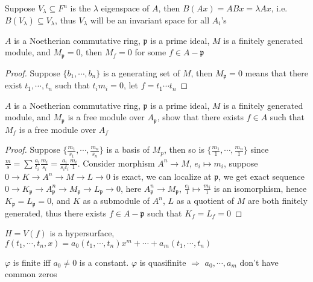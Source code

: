 \documentclass[main]{subfiles}
\begin{document}
\begin{solution}
Suppose $V_\lambda\subseteq F^n$ is the $\lambda$ eigenspace of $A$, then $B(Ax)=ABx=\lambda Ax$, i.e. $B(V_\lambda)\subseteq V_\lambda$, thus $V_\lambda$ will be an invariant space for all $A_i$'s
\end{solution}

\begin{exercise}\label{02/24/2020-16:00}
$A$ is a Noetherian commutative ring, $\mathfrak p$ is a prime ideal, $M$ is a finitely generated module, and $M_{\mathfrak p}=0$, then $M_f=0$ for some $f\in A-\mathfrak p$
\end{exercise}

\begin{proof}
Suppose $\{b_1,\cdots,b_n\}$ is a generating set of $M$, then $M_{\mathfrak p}=0$ means that there exist $t_1,\cdots,t_n$ such that $t_im_i=0$, let $f=t_1\cdots t_n$
\end{proof}

\begin{exercise}
$A$ is a Noetherian commutative ring, $\mathfrak p$ is a prime ideal, $M$ is a finitely generated module, and $M_{\mathfrak p}$ is a free module over $A_{\mathfrak p}$, show that there exists $f\in A$ such that $M_f$ is a free module over $A_f$
\end{exercise}

\begin{proof}
Suppose $\{\frac{m_1}{s_1},\cdots,\frac{m_n}{s_n}\}$ is a basis of $M_p$, then so is $\{\frac{m_1}{1},\cdots,\frac{m_n}{1}\}$ since $\frac{m}{s}=\sum\frac{a_i}{t_i}\frac{m_i}{s_i}=\frac{a_i}{s_it_i}\frac{m_i}{1}$. Consider morphism $A^n\to M$, $e_i\mapsto m_i$, suppose $0\to K\to A^n\to M\to L\to0$ is exact, we can localize at $\mathfrak p$, we get exact sequence $0\to K_{\mathfrak p}\to A_{\mathfrak p}^n\to M_{\mathfrak p}\to L_{\mathfrak p}\to0$, here $A_{\mathfrak p}^n\to M_{\mathfrak p}$, $\frac{e_i}{1}\mapsto\frac{m_i}{1}$ is an isomorphism, hence $K_{\mathfrak p}=L_{\mathfrak p}=0$, and $K$ as a submodule of $A^n$, $L$ as a quotient of $M$ are both finitely generated, thus there exists $f\in A-\mathfrak p$ such that $K_f=L_f=0$
\end{proof}

\begin{exercise}
$H=V(f)$ is a hypersurface, $f(t_1,\cdots,t_n,x)=a_0(t_1,\cdots,t_n)x^m+\cdots+a_m(t_1,\cdots,t_n)$
\begin{center}
\end{center}
$\varphi$ is finite iff $a_0\neq0$ is a constant. $\varphi$ is quasifinite $\Rightarrow$ $a_0,\cdots,a_m$ don't have common zeros
\end{exercise}
\end{document}
